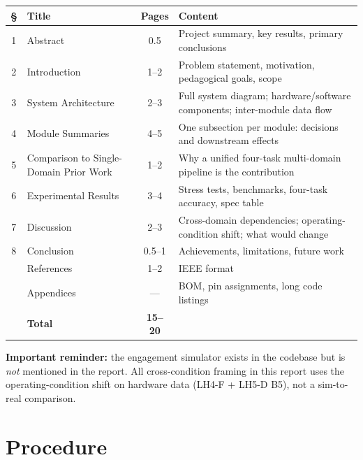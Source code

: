 \documentclass[11pt,letterpaper]{article}
\begin{document}
\begin{table}[h!]
	\centering
	\renewcommand{\arraystretch}{1.3}
	\begin{tabularx}{\textwidth}{c l c X}
		\toprule
		\textbf{\S} & \textbf{Title} & \textbf{Pages} & \textbf{Content} \\
		\midrule
		1 & Abstract              & 0.5    & Project summary, key results, primary conclusions \\
		2 & Introduction          & 1--2   & Problem statement, motivation, pedagogical goals, scope \\
		3 & System Architecture   & 2--3   & Full system diagram; hardware/software components; inter-module data flow \\
		4 & Module Summaries      & 4--5   & One subsection per module: decisions and downstream effects \\
		5 & Comparison to Single-Domain Prior Work & 1--2 & Why a unified four-task multi-domain pipeline is the contribution \\
		6 & Experimental Results  & 3--4   & Stress tests, benchmarks, four-task accuracy, spec table \\
		7 & Discussion            & 2--3   & Cross-domain dependencies; operating-condition shift; what would change \\
		8 & Conclusion            & 0.5--1 & Achievements, limitations, future work \\
		  & References            & 1--2   & IEEE format \\
		  & Appendices            & ---    & BOM, pin assignments, long code listings \\
		\midrule
		& \textbf{Total}          & \textbf{15--20} & \\
		\bottomrule
	\end{tabularx}
\end{table}

\textbf{Important reminder:} the engagement simulator exists in the codebase but is \emph{not} mentioned in the report. All cross-condition framing in this report uses the operating-condition shift on hardware data (LH4-F + LH5-D B5), not a sim-to-real comparison.

\section{Procedure}
\end{document}
